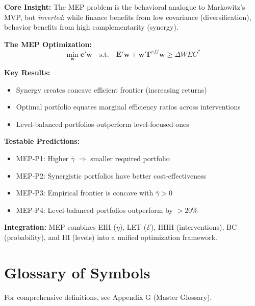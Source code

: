 \begin{tcolorbox}[colback=green!10!white, colframe=green!75!black,
    title=\textbf{Appendix CTW Summary: The Minimum Effective Portfolio}]

\textbf{Core Insight:}
The MEP problem is the behavioral analogue to Markowitz's MVP, but \textit{inverted}:
while finance benefits from low covariance (diversification), behavior benefits
from high complementarity (synergy).

\textbf{The MEP Optimization:}
\begin{equation*}
\min_{\mathbf{w}} \mathbf{c}'\mathbf{w} \quad \text{s.t.} \quad
\mathbf{E}'\mathbf{w} + \mathbf{w}'\boldsymbol{\Gamma}^{eff}\mathbf{w} \geq \Delta WEC^*
\end{equation*}

\textbf{Key Results:}
\begin{itemize}[nosep]
\item Synergy creates concave efficient frontier (increasing returns)
\item Optimal portfolio equates marginal efficiency ratios across interventions
\item Level-balanced portfolios outperform level-focused ones
\end{itemize}

\textbf{Testable Predictions:}
\begin{itemize}[nosep]
\item MEP-P1: Higher $\bar{\gamma}$ $\Rightarrow$ smaller required portfolio
\item MEP-P2: Synergistic portfolios have better cost-effectiveness
\item MEP-P3: Empirical frontier is concave with $\bar{\gamma} > 0$
\item MEP-P4: Level-balanced portfolios outperform by $>20\%$
\end{itemize}

\textbf{Integration:} MEP combines EIH ($\eta$), LET ($\mathcal{E}$), HHH (interventions),
BC (probability), and HI (levels) into a unified optimization framework.

\end{tcolorbox}


\section{Glossary of Symbols}

For comprehensive definitions, see Appendix G (Master Glossary).

